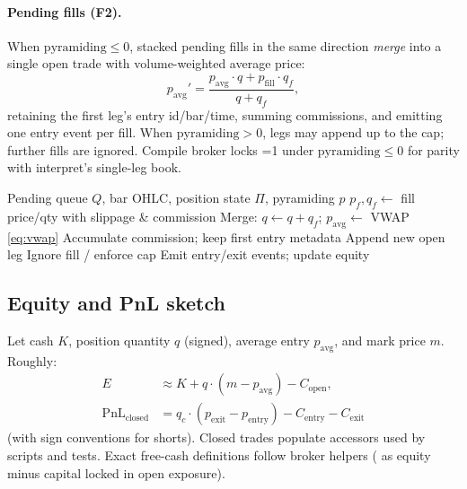 \documentclass[11pt,a4paper]{article}
\begin{document}
\paragraph{Pending fills (F2).}
When $\mathrm{pyramiding}\le 0$, stacked pending fills in the same direction
\emph{merge} into a single open trade with volume-weighted average price:
\begin{equation}
  p_{\mathrm{avg}}'
  = \frac{p_{\mathrm{avg}}\cdot q + p_{\mathrm{fill}}\cdot q_f}{q+q_f},
  \label{eq:vwap}
\end{equation}
retaining the first leg's entry id/bar/time, summing commissions, and
emitting one entry event per fill.
When $\mathrm{pyramiding}>0$, legs may append up to the cap; further fills are
ignored.
Compile broker locks =1 under $\mathrm{pyramiding}\le 0$
for parity with interpret's single-leg book.

\begin{algorithm}[t]
\caption{ProcessPendingFills (pyramiding $\le 0$ merge path)}
\label{alg:pending}
\begin{algorithmic}[1]
\Require Pending queue $Q$, bar OHLC, position state $\Pi$, pyramiding $p$
  \State $p_f,q_f \gets$ fill price/qty with slippage \& commission
    \State Merge: $q\gets q+q_f$;\; $p_{\mathrm{avg}}\gets$ VWAP \eqref{eq:vwap}
    \State Accumulate commission; keep first entry metadata
    \State Append new open leg
  \Else
    \State Ignore fill / enforce cap
  \EndIf
  \State Emit entry/exit events; update equity
\EndFor
\end{algorithmic}
\end{algorithm}

\subsection{Equity and PnL sketch}
Let cash $K$, position quantity $q$ (signed), average entry $p_{\mathrm{avg}}$,
and mark price $m$. Roughly:
\begin{align}
  E &\approx K + q\cdot(m-p_{\mathrm{avg}}) - C_{\mathrm{open}},
  \label{eq:equity}\\
  \mathrm{PnL}_{\mathrm{closed}}
  &= q_c\cdot(p_{\mathrm{exit}}-p_{\mathrm{entry}}) - C_{\mathrm{entry}}
    - C_{\mathrm{exit}}
  \label{eq:pnl}
\end{align}
(with sign conventions for shorts). Closed trades populate
 accessors used by scripts and tests.
Exact free-cash definitions follow broker helpers ( as equity minus
capital locked in open exposure).
\end{document}
